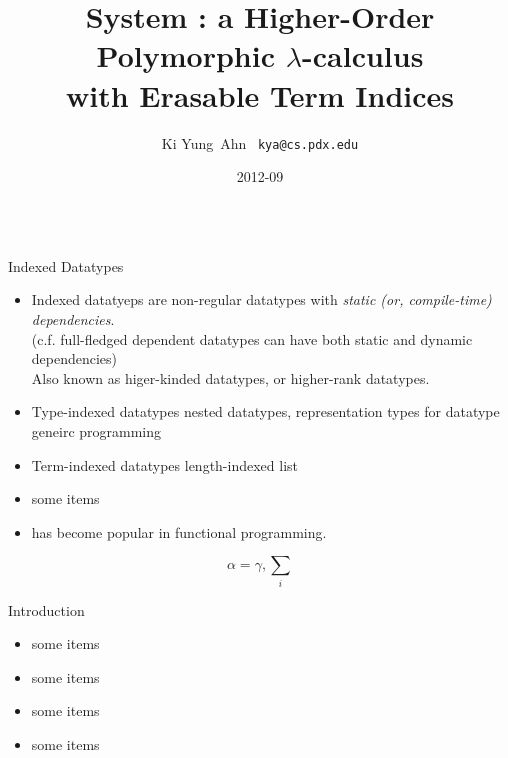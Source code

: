 \documentclass[final]{beamer}
\title[Fancy Posters]{{\VERYHuge System \Fi} {\Huge :}
		{\huge a Higher-Order Polymorphic $\lambda$-calculus} \\
		{\huge with Erasable Term Indices}
  }
\author[Ki Yung Ahn]{ Ki Yung $\,$Ahn $\,$ {\Large\texttt{kya@cs.pdx.edu}} }
\institute[Portland State University]{
	Department of Computer Science, Portland State University }
\date{2012-09}
\begin{document}
\begin{frame}
\vfill
\begin{columns}[t]

\begin{column}{.48\linewidth}

\begin{block}{Indexed Datatypes}
\begin{itemize}
\item Indexed datatyeps are non-regular datatypes
	with \emph{static (or, compile-time) dependencies}.\\
        (c.f. full-fledged dependent datatypes can have
        both static and dynamic dependencies) \\
	Also known as higer-kinded datatypes, or higher-rank datatypes.
\item Type-indexed datatypes
      nested datatypes,
      representation types for datatype geneirc programming
\item Term-indexed datatypes
        length-indexed list
\item some items
\item has become popular in
        functional programming.
\end{itemize} $$\alpha=\gamma, \sum_{i}$$
\end{block}

\begin{block}{Introduction}
\begin{itemize}
\item some items
\item some items
\item some items
\item some items
\end{itemize}
\end{block}


\end{column}
\end{columns}
\end{frame}
\end{document}
